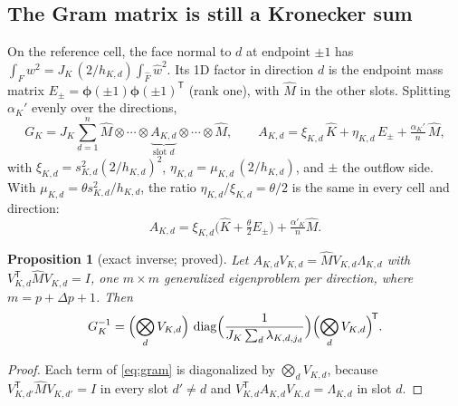 \documentclass[11pt]{article}
\newtheorem{proposition}{Proposition}
\theoremstyle{remark}
\newcommand{\T}{\mathsf{T}}
\DeclareMathOperator{\diag}{diag}
\begin{document}
\subsection{The Gram matrix is still a Kronecker sum}

On the reference cell, the face normal to $d$ at endpoint $\pm1$ has $\int_F w^2 = J_K\,(2/h_{K,d})\int_{\widehat F}\hat w^2$.
Its 1D factor in direction $d$ is the endpoint mass matrix
$E_\pm=\boldsymbol\phi(\pm1)\boldsymbol\phi(\pm1)^\T$ (rank one), with $\widehat M$ in the other slots.  Splitting
$\alpha_K'$ evenly over the directions,
\begin{equation}\label{eq:gram}
  G_K = J_K\sum_{d=1}^n \widehat M\otimes\cdots\otimes\underbrace{A_{K,d}}_{\text{slot }d}\otimes\cdots\otimes\widehat M,
  \qquad A_{K,d} = \xi_{K,d}\,\widehat K + \eta_{K,d}\,E_{\pm} + \tfrac{\alpha_K'}{n}\,\widehat M,
\end{equation}
with $\xi_{K,d}=s_{K,d}^2(2/h_{K,d})^2$, $\eta_{K,d}=\mu_{K,d}\,(2/h_{K,d})$, and $\pm$ the outflow side.  With
$\mu_{K,d}=\theta s_{K,d}^2/h_{K,d}$, the ratio $\eta_{K,d}/\xi_{K,d}=\theta/2$ is the same in every cell and direction:
\[ A_{K,d} = \xi_{K,d}\bigl(\widehat K+\tfrac\theta2E_\pm\bigr)+\tfrac{\alpha'_K}{n}\widehat M . \]

\begin{proposition}[exact inverse; proved]
Let $A_{K,d}V_{K,d}=\widehat M V_{K,d}\Lambda_{K,d}$ with $V_{K,d}^\T\widehat MV_{K,d}=I$, one $m\times m$ generalized
eigenproblem per direction, where $m=p+\Delta p+1$.  Then
\[
  G_K^{-1} = \Bigl(\bigotimes_d V_{K,d}\Bigr)\,\diag\Bigl(\frac{1}{J_K\sum_d\lambda_{K,d,j_d}}\Bigr)\Bigl(\bigotimes_d V_{K,d}\Bigr)^{\!\T}.
\]
\end{proposition}
\begin{proof}
Each term of \eqref{eq:gram} is diagonalized by $\bigotimes_dV_{K,d}$, because $V_{K,d'}^\T\widehat MV_{K,d'}=I$ in
every slot $d'\ne d$ and $V_{K,d}^\T A_{K,d}V_{K,d}=\Lambda_{K,d}$ in slot $d$.
\end{proof}
\end{document}
